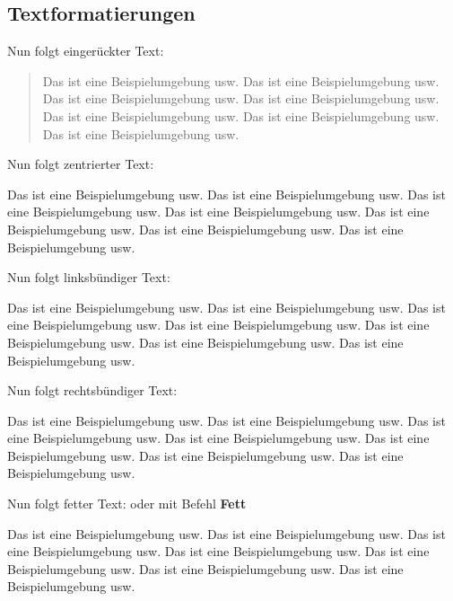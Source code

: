 \clearpage
\subsection{Textformatierungen}

Nun folgt eingerückter Text: 

\begin{quote}
Das ist eine Beispielumgebung usw. Das ist eine Beispielumgebung usw. Das ist eine Beispielumgebung usw. Das ist eine Beispielumgebung usw. Das ist eine Beispielumgebung usw. Das ist eine Beispielumgebung usw. Das ist eine Beispielumgebung usw.
\end{quote}

Nun folgt zentrierter Text: 

\begin{center}
Das ist eine Beispielumgebung usw. Das ist eine Beispielumgebung usw. Das ist eine Beispielumgebung usw. Das ist eine Beispielumgebung usw. Das ist eine Beispielumgebung usw. Das ist eine Beispielumgebung usw. Das ist eine Beispielumgebung usw.
\end{center}

Nun folgt linksbündiger Text: 

\begin{flushleft}
Das ist eine Beispielumgebung usw. Das ist eine Beispielumgebung usw. Das ist eine Beispielumgebung usw. Das ist eine Beispielumgebung usw. Das ist eine Beispielumgebung usw. Das ist eine Beispielumgebung usw. Das ist eine Beispielumgebung usw.
\end{flushleft}

Nun folgt rechtsbündiger Text: 

\begin{flushright}
Das ist eine Beispielumgebung usw. Das ist eine Beispielumgebung usw. Das ist eine Beispielumgebung usw. Das ist eine Beispielumgebung usw. Das ist eine Beispielumgebung usw. Das ist eine Beispielumgebung usw. Das ist eine Beispielumgebung usw.
\end{flushright}

Nun folgt fetter Text: oder mit Befehl \textbf{Fett}

\begin{bfseries}
Das ist eine Beispielumgebung usw. Das ist eine Beispielumgebung usw. Das ist eine Beispielumgebung usw. Das ist eine Beispielumgebung usw. Das ist eine Beispielumgebung usw. Das ist eine Beispielumgebung usw. Das ist eine Beispielumgebung usw.
\end{bfseries}

